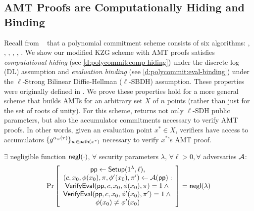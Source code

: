 \subsection{AMT Proofs are Computationally Hiding and Binding}
\label{s:proofs}
Recall from ~\cite{polycommit} that a polynomial commitment scheme consists of six algorithms: \polysetup, \polycommit, \polyopen, \polyverifypoly, \polycreatewitness, \polyverifyeval.
We show our modified KZG scheme with AMT proofs satisfies \textit{computational hiding} (see \cref{d:polycommit:comp-hiding}) under the discrete log (DL) assumption and \textit{evaluation binding} (see \cref{d:polycommit:eval-binding}) under the $\ell$-Strong Bilinear Diffie-Hellman ($\ell$-SBDH) assumption.
These properties were originally defined in \cite{polycommit}.
We prove these properties hold for a more general scheme that builds AMTs for an arbitrary set $X$ of $n$ points (rather than just for the set of roots of unity).
For this scheme, \polysetup returns not only $\ell$-SDH public parameters, but also the accumulator commitments necessary to verify AMT proofs.
In other words, given an evaluation point $x^{*} \in X$, verifiers have access to accumulators $\{g^{a_w(\tau)}\}_{w\in\mathsf{path}(x^{*})}$ necessary to verify $x^{*}$'s AMT proof.



\begin{definition}
\label{d:polycommit:eval-binding}
$\exists$ negligible function $\mathsf{negl}(\cdot)$, $\forall$ security parameters $\lambda$, $\forall \ell > 0,\forall$ adversaries ${\mathcal{A}}$:
\begin{align*}
\Pr \left[ \begin{array}{c}
    \mathsf{pp} \leftarrow \mathsf{Setup}(1^\lambda, \ell),\\
    (c, x_0, \phi(x_0), \pi, \phi'(x_0), \pi') \leftarrow {\ensuremath{\mathcal{A}}}(\mathsf{pp}):\\
    \mathsf{VerifyEval{}}(\mathsf{pp},c,x_0,\phi(x_0), \pi) = 1 \wedge {}\\
    \mathsf{VerifyEval{}}(\mathsf{pp},c,x_0,\phi'(x_0), \pi') = 1 \wedge {}\\
    \phi(x_0) \ne \phi'(x_0)
\end{array} \right] = \mathsf{negl}(\lambda)
\end{align*}
\end{definition}

